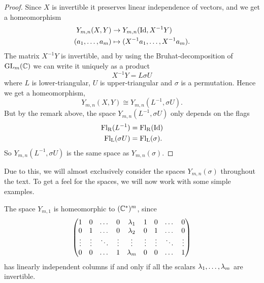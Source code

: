 \begin{proof}
  Since $X$ is invertible it preserves linear independence of vectors,
  and we get a homeomorphism
  \begin{align*}
    Y_{m,n}(X,Y) &\to Y_{m,n}(\operatorname{Id},X^{-1}Y) \\
    (a_1,\dots,a_m) &\mapsto (X^{-1}a_1,\dots,X^{-1}a_m).
  \end{align*}
  The matrix $X^{-1}Y$ is invertible, and by using the
  Bruhat-decomposition of $\mathrm{GL}_m(\mathbb{C})$ we can write it uniquely as a
  product 
  \[ X^{-1}Y = L\sigma U \]
  where $L$ is lower-triangular, $U$ is upper-triangular and $\sigma$
  is a permutation. Hence we get a homeomorphism,
  \[ Y_{m,n}(X,Y) \cong Y_{m,n}(L^{-1}, \sigma U). \]
  But by the remark above, the space $Y_{m,n}(L^{-1},\sigma U)$ only
  depends
  on the flags 
  \begin{align*}
    \mathrm{Fl_R}(L^{-1}) &= \mathrm{Fl_R}(\operatorname{Id}) \\
    \mathrm{Fl_L}(\sigma U) &= \mathrm{Fl_L}(\sigma).
  \end{align*}
  So $Y_{m,n}(L^{-1},\sigma U)$ is the same space as $Y_{m,n}(\sigma)$.
\end{proof}

Due to this, we will almost exclusively consider the spaces
$Y_{m,n}(\sigma)$ throughout the text. To get a feel for the spaces,
we will now work with some simple examples.

\begin{example}
  \label{ex:n=1}
  The space $Y_{m,1}$ is homeomorphic to $(\mathbb{C}^*)^m$, since
  \[\begin{pmatrix}
    1&0&\dots&0&\lambda_1&1&0&\dots&0 \\
    0&1&\dots&0&\lambda_2&0&1&\dots&0 \\
    \vdots&\vdots&\ddots&\vdots&\vdots&\vdots&\vdots&\ddots&\vdots \\
    0&0&\dots&1&\lambda_m&0&0&\dots&1
  \end{pmatrix} \]
  has linearly independent columns if and only if all the scalars
  $\lambda_1,\dots,\lambda_m$ are invertible.
\end{example}

